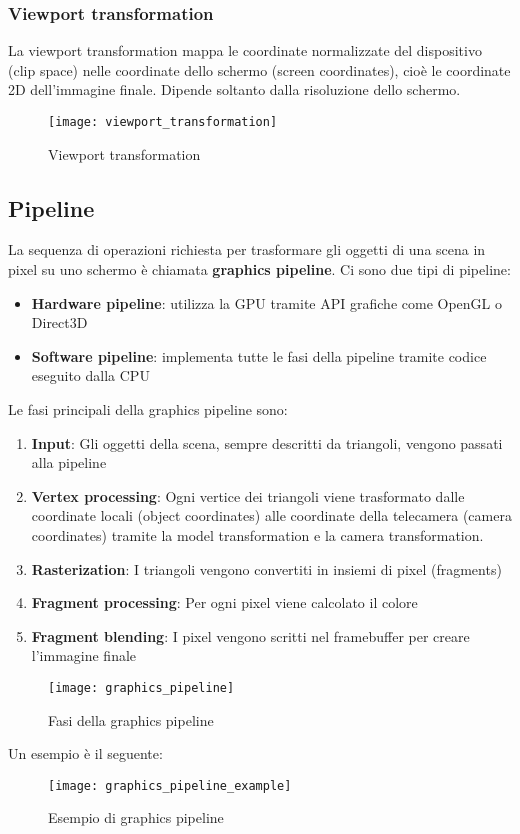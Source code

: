 \documentclass[a4paper]{article}
\begin{document}
\subsubsection{Viewport transformation}
La viewport transformation mappa le coordinate normalizzate del dispositivo (clip space)
nelle coordinate dello schermo (screen coordinates), cioè le coordinate 2D dell'immagine
finale. Dipende soltanto dalla risoluzione dello schermo.
\begin{figure}[H]
  \centering
  \texttt{[image: viewport\_transformation]}
  \caption{Viewport transformation}
\end{figure}

\subsection{Pipeline}
La sequenza di operazioni richiesta per trasformare gli oggetti di una scena in pixel
su uno schermo è chiamata \textbf{graphics pipeline}. Ci sono due tipi di pipeline:
\begin{itemize}
  \item \textbf{Hardware pipeline}: utilizza la GPU tramite API grafiche come OpenGL
    o Direct3D
  \item \textbf{Software pipeline}: implementa tutte le fasi della pipeline tramite codice
    eseguito dalla CPU
\end{itemize}
Le fasi principali della graphics pipeline sono:
\begin{enumerate}
  \item \textbf{Input}: Gli oggetti della scena, sempre descritti da triangoli, vengono
    passati alla pipeline
  \item \textbf{Vertex processing}: Ogni vertice dei triangoli viene trasformato dalle
    coordinate locali (object coordinates) alle coordinate della telecamera (camera coordinates)
    tramite la model transformation e la camera transformation.
  \item \textbf{Rasterization}: I triangoli vengono convertiti in insiemi di pixel (fragments)
  \item \textbf{Fragment processing}: Per ogni pixel viene calcolato il colore
  \item \textbf{Fragment blending}: I pixel vengono scritti nel framebuffer per creare
    l'immagine finale
\end{enumerate}
\begin{figure}[H]
  \centering
  \texttt{[image: graphics\_pipeline]}
  \caption{Fasi della graphics pipeline}
\end{figure}
Un esempio è il seguente:
\begin{figure}[H]
  \centering
  \texttt{[image: graphics\_pipeline\_example]}
  \caption{Esempio di graphics pipeline}
\end{figure}
\end{document}

